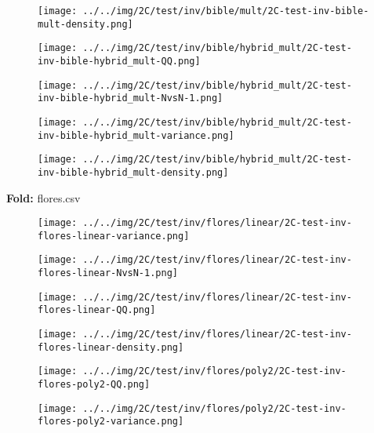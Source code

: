 \begin{figure}[H]
\centering	\texttt{[image: ../../img/2C/test/inv/bible/mult/2C-test-inv-bible-mult-density.png]}
\end{figure}
\begin{figure}[H]
\centering	\texttt{[image: ../../img/2C/test/inv/bible/hybrid\_mult/2C-test-inv-bible-hybrid\_mult-QQ.png]}
\end{figure}
\begin{figure}[H]
\centering	\texttt{[image: ../../img/2C/test/inv/bible/hybrid\_mult/2C-test-inv-bible-hybrid\_mult-NvsN-1.png]}
\end{figure}
\begin{figure}[H]
\centering	\texttt{[image: ../../img/2C/test/inv/bible/hybrid\_mult/2C-test-inv-bible-hybrid\_mult-variance.png]}
\end{figure}
\begin{figure}[H]
\centering	\texttt{[image: ../../img/2C/test/inv/bible/hybrid\_mult/2C-test-inv-bible-hybrid\_mult-density.png]}
\end{figure}
\textbf{Fold:} flores.csv
\begin{figure}[H]
\centering	\texttt{[image: ../../img/2C/test/inv/flores/linear/2C-test-inv-flores-linear-variance.png]}
\end{figure}
\begin{figure}[H]
\centering	\texttt{[image: ../../img/2C/test/inv/flores/linear/2C-test-inv-flores-linear-NvsN-1.png]}
\end{figure}
\begin{figure}[H]
\centering	\texttt{[image: ../../img/2C/test/inv/flores/linear/2C-test-inv-flores-linear-QQ.png]}
\end{figure}
\begin{figure}[H]
\centering	\texttt{[image: ../../img/2C/test/inv/flores/linear/2C-test-inv-flores-linear-density.png]}
\end{figure}
\begin{figure}[H]
\centering	\texttt{[image: ../../img/2C/test/inv/flores/poly2/2C-test-inv-flores-poly2-QQ.png]}
\end{figure}
\begin{figure}[H]
\centering	\texttt{[image: ../../img/2C/test/inv/flores/poly2/2C-test-inv-flores-poly2-variance.png]}
\end{figure}

